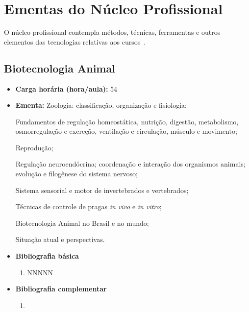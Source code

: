 \documentclass[11pt,fleqn]{book} %
\begin{document}
\newpage
\section{Ementas do Núcleo Profissional}\label{ementasTecnico}
\indent

O núcleo profissional contempla métodos, técnicas, ferramentas e outros elementos das tecnologias relativas aos cursos~\cite{Resolucao06De2012}.

\newpage
\subsection{Biotecnologia Animal}\label{disc:biotecAnimal}
\begin{itemize}
	\item \textbf{Carga horária (hora/aula):} 54
	\item \textbf{Ementa:}	
	Zoologia: classificação, organização e fisiologia;
	
	Fundamentos de regulação homeostática, nutrição, digestão, metabolismo, osmorregulação e excreção, ventilação e circulação, músculo e movimento;
	
	Reprodução; 

	Regulação neuroendócrina; coordenação e interação dos organismos animais; evolução e filogênese do sistema nervoso; 
	
	Sistema sensorial e motor de invertebrados e vertebrados;	
	
	Técnicas de controle de pragas \textit{in vivo} e \textit{in vitro};
	
	Biotecnologia Animal no Brasil e no mundo; 
	
	Situação atual e perspectivas.
	\item \textbf{Bibliografia básica}
	\begin{enumerate}
		\item NNNNN
	\end{enumerate}
	\item \textbf{Bibliografia complementar}
	\begin{enumerate}
		\item 
	\end{enumerate}	
\end{itemize}

\newpage
\end{document}
